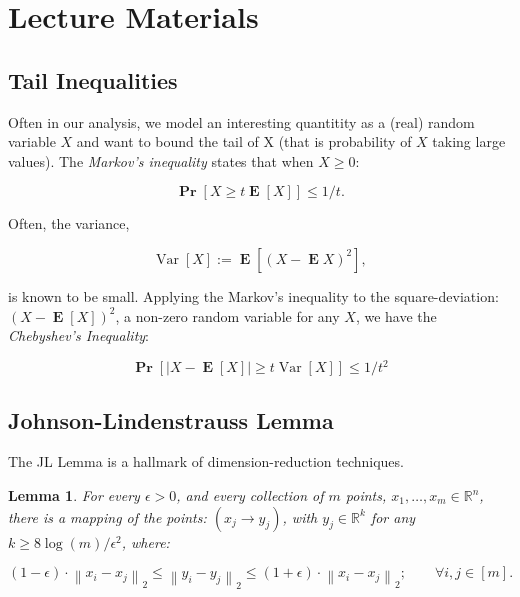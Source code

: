 \documentclass[solution,addpoints,12pt]{exam}
\newtheorem{lemma}[theorem]{Lemma}
\newcommand{\brac}[1]{\left[ #1 \right]}
\newcommand{\card}[1]{\left\lvert #1 \right\rvert}
\def\abs{\card}
\newcommand{\prob}{\operatorname{\mathbf{Pr}}}
\newcommand{\ex}{\operatorname{\mathbf{E}}}
\newcommand{\variance}{\operatorname{Var}}
\newcommand{\reals}{\mathbb{R}}
\newcommand{\norm}[1]{\left\lVert #1 \right\rVert}
\begin{document}
\eject
\appendix
\section{Lecture Materials}

\subsection{Tail Inequalities}

Often in our analysis, we model an interesting quantitity as a (real) random variable $X$ and want to bound the tail of X (that is probability of $X$ taking large values).  The \emph{Markov's inequality} states that when $X \ge 0$:

\[ \prob\brac{X \ge t \ex\brac{X}} \le 1/t. \]

Often, the variance,

\[ \variance\brac{X} := \ex\brac{(X - \ex{X})^2}, \]

is known to be small.  Applying the Markov's inequality to the square-deviation: $(X - \ex[X])^2$, a non-zero random variable for any $X$, we have the \emph{Chebyshev's Inequality}:

\[ \prob\brac{\abs{X - \ex\brac{X}} \ge t \variance\brac{X}  }  \le 1/t^2 \]

\subsection{Johnson-Lindenstrauss Lemma}

The JL Lemma is a hallmark of dimension-reduction techniques.

\begin{lemma}
  For every $\epsilon > 0$, and every collection of $m$ points, $x_1, \ldots, x_m \in \reals^n$, there is a mapping of the points: $(x_j \to y_j)$, with $y_j \in \reals^k$ for any $k \ge {8 \log(m)}/{\epsilon^2}$, where:

  \[ (1 - \epsilon) \cdot \norm{x_i - x_j}_2 \le \norm{y_i - y_j}_2 \le (1 + \epsilon) \cdot \norm{x_i - x_j}_2; \qquad \forall i, j \in [m].  \]
\end{lemma}



\end{document}
